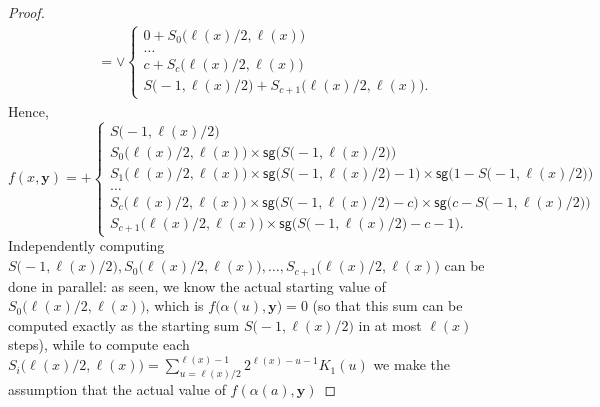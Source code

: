 \documentclass[11pt, oneside]{article}
\newcommand{\fun}[1]{\mathsf{#1}}
\newcommand{\tu}[1]{\mathbf{#1}}
\theoremstyle{definition}
\begin{document}
\begin{toappendix}
\begin{proof}
\begin{align*}
        &= \vee \begin{cases}
            0 + S_0\big(\ell(x)/2, \ell(x)\big) \\
            \dots \\
            c + S_c\big(\ell(x)/2, \ell(x)\big) \\
            S\big(-1, \ell(x)/2\big) + S_{c+1}\big(\ell(x)/2, \ell(x)\big).
        \end{cases}
    \end{align*}
    Hence,
    $$
    f(x, \tu y) = + \begin{cases}
        S\big(-1, \ell(x)/2\big) \\
        S_0\big(\ell(x)/2, \ell(x)\big) \times \fun{sg}\big(S\big(-1, \ell(x)/2\big)\big) \\
        S_1\big(\ell(x)/2, \ell(x)\big) \times \fun{sg}\big(S\big(-1, \ell(x)/2\big)-1\big) \times \fun{sg}\big(1-S\big(-1, \ell(x)/2\big)\big) \\
        \dots \\
        S_c \big(\ell(x)/2, \ell(x)\big) \times \fun{sg}\big(S\big(-1, \ell(x)/2\big)-c\big) \times \fun{sg}\big(c-S\big(-1, \ell(x)/2\big)\big) \\
        S_{c+1} \big(\ell(x)/2, \ell(x)\big) \times \fun{sg}\big(S\big(-1, \ell(x)/2\big)-c-1\big).
    \end{cases}
    $$
    Independently computing $S\big(-1, \ell(x)/2\big), S_0\big(\ell(x)/2, \ell(x)\big), \dots, S_{c+1}\big(\ell(x)/2, \ell(x)\big)$ can be done in parallel: as seen, we know the actual starting value of $S_0\big(\ell(x)/2, \ell(x)\big)$, which is $f\big(\alpha(u), \tu y\big)=0$ (so that this sum can be computed exactly as the starting sum $S\big(-1, \ell(x)/2\big)$ in at most $\ell(x)$ steps),
    while to compute each $S_i\big(\ell(x)/2, \ell(x)\big)=\sum^{\ell(x)-1}_{u=\ell(x)/2} 2^{\ell(x)-u-1} K_1(u)$ we make the assumption that the actual value of $f(\alpha(a), \tu y)$
\end{proof}

\end{toappendix}
\end{document}
